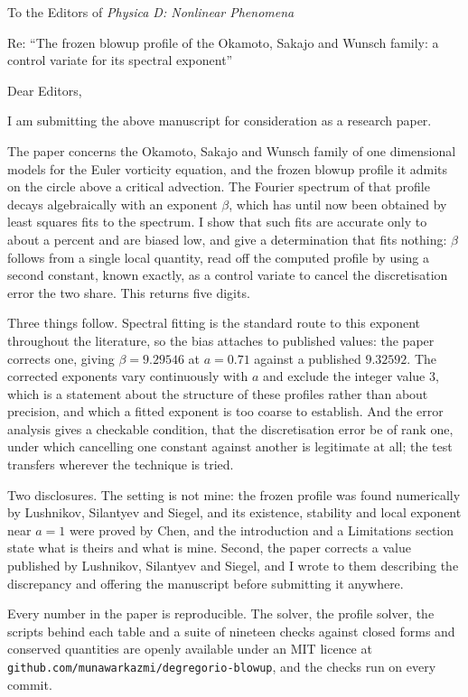 \documentclass[11pt]{article}
\begin{document}
\noindent To the Editors of \emph{Physica D: Nonlinear Phenomena}

\bigskip

\noindent Re: ``The frozen blowup profile of the Okamoto, Sakajo and Wunsch
family: a control variate for its spectral exponent''

\bigskip

\noindent Dear Editors,

I am submitting the above manuscript for consideration as a research paper.

The paper concerns the Okamoto, Sakajo and Wunsch family of one dimensional
models for the Euler vorticity equation, and the frozen blowup profile it
admits on the circle above a critical advection. The Fourier spectrum of that
profile decays algebraically with an exponent $\beta$, which has until now been
obtained by least squares fits to the spectrum. I show that such fits are
accurate only to about a percent and are biased low, and give a determination
that fits nothing: $\beta$ follows from a single local quantity, read off the
computed profile by using a second constant, known exactly, as a control
variate to cancel the discretisation error the two share. This returns five
digits.

Three things follow. Spectral fitting is the standard route to this exponent
throughout the literature, so the bias attaches to published values: the paper
corrects one, giving $\beta = 9.29546$ at $a = 0.71$ against a published
$9.32592$. The corrected exponents vary continuously with $a$ and exclude the
integer value $3$, which is a statement about the structure of these profiles
rather than about precision, and which a fitted exponent is too coarse to
establish. And the error analysis gives a checkable condition, that the
discretisation error be of rank one, under which cancelling one constant
against another is legitimate at all; the test transfers wherever the technique
is tried.

Two disclosures. The setting is not mine: the frozen profile was found
numerically by Lushnikov, Silantyev and Siegel, and its existence, stability
and local exponent near $a = 1$ were proved by Chen, and the introduction and a
Limitations section state what is theirs and what is mine. Second, the paper
corrects a value published by Lushnikov, Silantyev and Siegel, and I wrote to
them describing the discrepancy and offering the manuscript before submitting
it anywhere.

Every number in the paper is reproducible. The solver, the profile solver, the
scripts behind each table and a suite of nineteen checks against closed forms
and conserved quantities are openly available under an MIT licence at
\texttt{github.com/munawarkazmi/degregorio-blowup}, and the checks run on every
commit.
\end{document}
